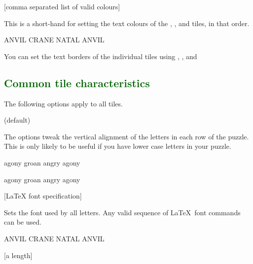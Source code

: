 \documentclass[svgnames]{report}
\newcommand\Section[1]{\subsection{\textcolor{DarkGreen}{#1}}}
\begin{document}
  [comma separated list of valid colours]

  This is a short-hand for setting the text colours of the
  , ,  and 
  tiles, in that order.

  \begin{example}
  \begin{wordle}[text={red, orange,blue}]{ANVIL}
    CRANE
    NATAL
    ANVIL
  \end{wordle}
  \end{example}

  You can set the text borders of the individual tiles using
  , ,  and 


  \Section{Common tile characteristics}

  The following options apply to all tiles.

   (default) \qquad

  The options tweak the vertical alignment of the letters in each row of
  the puzzle. This is only likely to be useful if you have lower case
  letters in your puzzle.

  \begin{example}
  \begin{wordle}[align]{agony}
     groan
     angry
     agony
  \end{wordle}
  \end{example}

  \begin{example}
  \begin{wordle}[noalign]{agony} %
    groan
    angry
    agony
  \end{wordle}
  \end{example}

       [LaTeX font specification]

  Sets the font used by all  letters. Any valid sequence
  of \LaTeX\ font commands can be used.

  \begin{example}
  \begin{wordle}[font=\large\sffamily]{ANVIL}
    CRANE
    NATAL
    ANVIL
  \end{wordle}
  \end{example}

  [a length]
\end{document}
